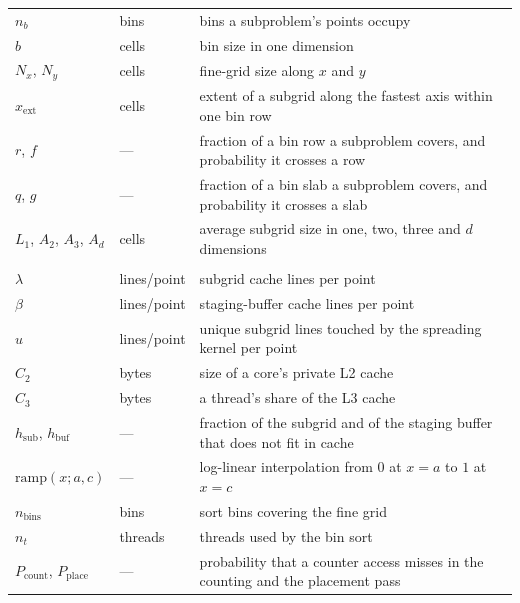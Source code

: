 \begin{tabularx}{\textwidth}{@{}l l X@{}}
$n_b$           & bins       & bins a subproblem's points occupy \\
$b$             & cells      & bin size in one dimension \\
$N_x$, $N_y$    & cells      & fine-grid size along $x$ and $y$ \\
$x_{\mathrm{ext}}$ & cells   & extent of a subgrid along the fastest axis within one bin row \\
$r$, $f$        & ---        & fraction of a bin row a subproblem covers, and probability it crosses a row \\
$q$, $g$        & ---        & fraction of a bin slab a subproblem covers, and probability it crosses a slab \\
$L_1$, $A_2$, $A_3$, $A_d$ & cells & average subgrid size in one, two, three and $d$ dimensions \\
\addlinespace
\multicolumn{3}{@{}l}{\emph{Memory traffic model}} \\
$\lambda$       & lines/point & subgrid cache lines per point \\
$\beta$         & lines/point & staging-buffer cache lines per point \\
$u$             & lines/point & unique subgrid lines touched by the spreading kernel per point \\
$C_2$           & bytes      & size of a core's private L2 cache \\
$C_3$           & bytes      & a thread's share of the L3 cache \\
$h_{\mathrm{sub}}$, $h_{\mathrm{buf}}$ & --- & fraction of the subgrid and of the staging buffer that does not fit in cache \\
$\mathrm{ramp}(x; a, c)$ & --- & log-linear interpolation from $0$ at $x = a$ to $1$ at $x = c$ \\
$n_{\mathrm{bins}}$ & bins   & sort bins covering the fine grid \\
$n_t$           & threads    & threads used by the bin sort \\
$P_{\mathrm{count}}$, $P_{\mathrm{place}}$ & --- & probability that a counter access misses in the counting and the placement pass \\
\bottomrule
\end{tabularx}
